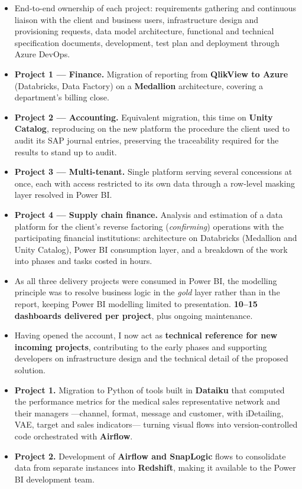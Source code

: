 \documentclass[10pt]{article}
\begin{document}
\begin{itemize}
    \item End-to-end ownership of each project: requirements gathering and continuous liaison with the client and business users, infrastructure design and provisioning requests, data model architecture, functional and technical specification documents, development, test plan and deployment through Azure DevOps.
    \item \textbf{Project 1 --- Finance.} Migration of reporting from \textbf{QlikView to Azure} (Databricks, Data Factory) on a \textbf{Medallion} architecture, covering a department's billing close.
    \item \textbf{Project 2 --- Accounting.} Equivalent migration, this time on \textbf{Unity Catalog}, reproducing on the new platform the procedure the client used to audit its SAP journal entries, preserving the traceability required for the results to stand up to audit.
    \item \textbf{Project 3 --- Multi-tenant.} Single platform serving several concessions at once, each with access restricted to its own data through a row-level masking layer resolved in Power BI.
    \item \textbf{Project 4 --- Supply chain finance.} Analysis and estimation of a data platform for the client's reverse factoring (\textit{confirming}) operations with the participating financial institutions: architecture on Databricks (Medallion and Unity Catalog), Power BI consumption layer, and a breakdown of the work into phases and tasks costed in hours.
    \item As all three delivery projects were consumed in Power BI, the modelling principle was to resolve business logic in the \textit{gold} layer rather than in the report, keeping Power BI modelling limited to presentation. \textbf{10--15 dashboards delivered per project}, plus ongoing maintenance.
    \item Having opened the account, I now act as \textbf{technical reference for new incoming projects}, contributing to the early phases and supporting developers on infrastructure design and the technical detail of the proposed solution.
\end{itemize}

\begin{itemize}
    \item \textbf{Project 1.} Migration to Python of tools built in \textbf{Dataiku} that computed the performance metrics for the medical sales representative network and their managers —channel, format, message and customer, with iDetailing, VAE, target and sales indicators— turning visual flows into version-controlled code orchestrated with \textbf{Airflow}.
    \item \textbf{Project 2.} Development of \textbf{Airflow and SnapLogic} flows to consolidate data from separate instances into \textbf{Redshift}, making it available to the Power BI development team.
\end{itemize}
\end{document}
